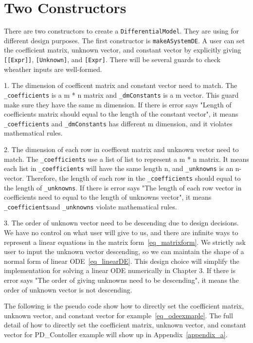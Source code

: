 \section{Two Constructors}
There are two constructors to create a \verb|DifferentialModel|. They are using for different design purposes. The first constructor is \verb|makeASystemDE|. A user can set the coefficient matrix, unknown vector, and constant vector by explicitly giving \verb|[[Expr]]|, \verb|[Unknown]|, and \verb|[Expr]|. There will be several guards to check wheather inputs are well-formed.

1. The dimension of coefficent matrix and constant vector need to match. The \verb|_coefficients| is a m * n matrix and \verb|_dmConstants| is a m vector. This guard make sure they have the same m dimension. If there is error says "Length of coefficients matrix should equal to the length of the constant vector", it means \verb|_coefficients| and \verb|_dmConstants| has different m dimension, and it violates mathematical rules.

2. The dimension of each row in coefficent matrix and unknown vector need to match. The \verb|_coefficients| use a list of list to represent a m * n matrix. It means each list in \verb|_coefficients| will have the same length n, and \verb|_unknowns| is an n-vector. Therefore, the length of each row in the \verb|_coefficients| should equal to the length of \verb|_unknowns|. If there is error says "The length of each row vector in coefficients need to equal to the length of unknowns vector", it means \verb|_coefficients|and \verb|_unknowns| violate mathematical rules.

3. The order of unknown vector need to be descending due to design decisions. We have no control on what user will give to us, and there are infinite ways to represent a linear equations in the matrix form~\ref{eq_matrixform}. We strictly ask user to input the unknown vector descending, so we can maintain the shape of a normal form of linear ODE~\ref{eq_linearDE}. This design choice will simplify the implementation for solving a linear ODE numerically in Chapter 3. If there is error says "The order of giving unknowns need to be descending", it means the order of unknown vector is not descending.

The following is the pseudo code show how to directly set the coefficient matrix, unknown vector, and constant vector for example~\ref{eq_odeexmaple}. The full detail of how to directly set the coefficient matrix, unknown vector, and constant vector for PD\_Contoller example will show up in Appendix~\ref{appendix_a}.

